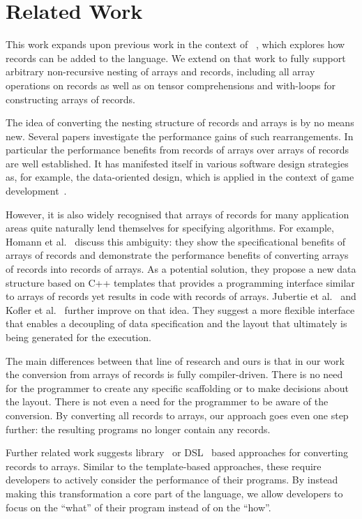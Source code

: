 
\section{Related Work}

This work expands upon previous work in the context of \sac{}~\cite{sac-records}, which explores how records can be added to the language.
We extend on that work to fully support arbitrary non-recursive nesting of arrays and records, including all array operations on records as well as on tensor comprehensions and with-loops for constructing arrays of records.

The idea of converting the nesting structure of records and arrays is by no means new.
Several papers investigate the performance gains of such rearrangements. 
In particular the performance benefits from records of arrays over arrays of records are well established.
It has manifested itself in various software design strategies as, for example, 
the data-oriented design, which is applied in the context of game development~\cite{dod}.

However, it is also widely recognised that arrays of records for many application areas quite naturally lend themselves  for specifying algorithms.
For example, Homann et al.~\cite{SoA} discuss this ambiguity: they show the specificational benefits of arrays of records and demonstrate the performance benefits of converting arrays of records into records of arrays.
As a potential solution, they propose a new data structure based on C++ templates that provides a programming interface similar to arrays of records yet results in code with records of arrays. 
Jubertie et al.~\cite{AoSoA} and Kofler et al.~\cite{AoSoA2} further improve on that idea.
They suggest a more flexible interface that enables a decoupling of data specification and the layout that ultimately is being generated for the execution.

The main differences between that line of research and ours is that in our work the conversion from arrays of records is fully compiler-driven.
There is no need for the programmer to create any specific scaffolding or to make decisions about the layout. There is not even a need for the programmer to be aware of the conversion.
By converting all records to arrays, our approach goes even one step further: the resulting programs no longer contain any records. 

Further related work suggests library~\cite{record-library,record-library2} or DSL~\cite{record-dsl} based approaches for converting records to arrays.
Similar to the template-based approaches, these require developers to actively consider the performance of their programs.
By instead making this transformation a core part of the \sac{} language, we allow developers to focus on the ``what'' of their program instead of on the ``how''.

